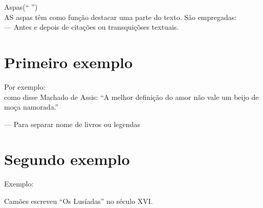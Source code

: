 \documentclass[12pt, article, oneside]{memoir}
\begin{document}
Aspas(`` '')\\
AS aspas têm como função destacar uma parte do texto. São empregadas:\\
--- Antes e depois de citações ou transquiçõses textuais.
\newpage
\chapter{Primeiro exemplo}
Por exemplo:\\
como disse Machado de Assis: ``A melhor definição do amor não vale um beijo de moça namorada.''

--- Para separar nome de livros ou legendas\\
\newpage
\chapter{Segundo exemplo}
Exemplo:

Camões escreveu ``Os Lusíadas'' no século XVI.
\end{document}
